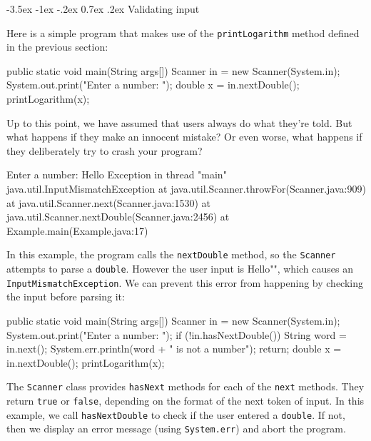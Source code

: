 \documentclass[12pt]{book}
\makeatletter
\theoremstyle{exercise}
\newcommand{\java}[1]{\verb"#1"}
\renewcommand{\section}{\@startsection {section}{1}{\z@}%
    {-3.5ex \@plus -1ex \@minus -.2ex}%
    {0.7ex \@plus.2ex}%
    {\normalfont\Large\bfseries}}
\newcommand{\java}[1]{\lstinline{#1}} %
\makeatother
\begin{document}
\section{Validating input}

Here is a simple program that makes use of the \java{printLogarithm} method defined in the previous section:

\begin{code}
    public static void main(String args[]) {
        Scanner in = new Scanner(System.in);
        System.out.print("Enter a number: ");
        double x = in.nextDouble();
        printLogarithm(x);
    }
\end{code}

Up to this point, we have assumed that users always do what they're told.
But what happens if they make an innocent mistake?
Or even worse, what happens if they deliberately try to crash your program?

\begin{stdout}
Enter a number: Hello
Exception in thread "main" java.util.InputMismatchException
    at java.util.Scanner.throwFor(Scanner.java:909)
    at java.util.Scanner.next(Scanner.java:1530)
    at java.util.Scanner.nextDouble(Scanner.java:2456)
    at Example.main(Example.java:17)
\end{stdout}

In this example, the program calls the \java{nextDouble} method, so the \java{Scanner} attempts to parse a \java{double}.
However the user input is \java{"Hello"}, which causes an \java{InputMismatchException}.
We can prevent this error from happening by checking the input before parsing it:

\begin{code}
    public static void main(String args[]) {
        Scanner in = new Scanner(System.in);
        System.out.print("Enter a number: ");
        if (!in.hasNextDouble()) {
            String word = in.next();
            System.err.println(word + " is not a number");
            return;
        }
        double x = in.nextDouble();
        printLogarithm(x);
    }
\end{code}

The \java{Scanner} class provides \java{hasNext} methods for each of the \java{next} methods.
They return \java{true} or \java{false}, depending on the format of the next token of input.
In this example, we call \java{hasNextDouble} to check if the user entered a \java{double}.
If not, then we display an error message (using \java{System.err}) and abort the program.
\end{document}
